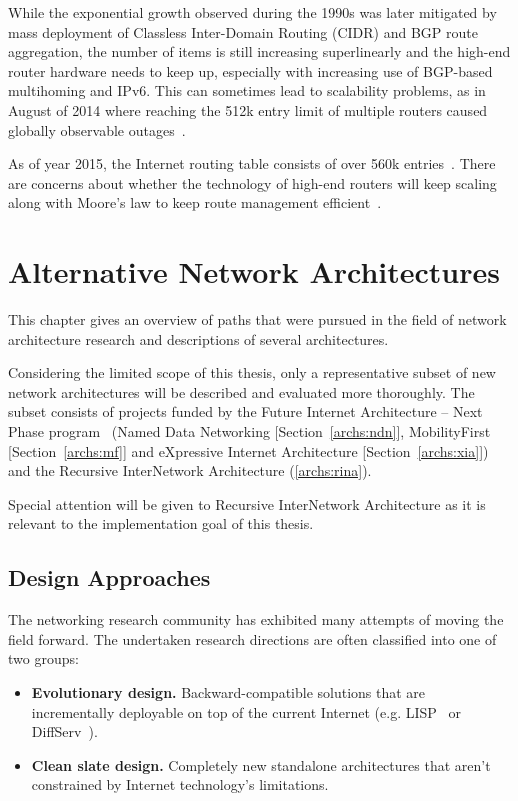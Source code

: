         While the exponential growth observed during the 1990s was later mitigated by mass deployment of Classless Inter-Domain Routing (CIDR) and BGP route aggregation, the number of items is still increasing superlinearly and the high-end router hardware needs to keep up, especially with increasing use of BGP-based multihoming and IPv6. This can sometimes lead to scalability problems, as in August of 2014 where reaching the 512k entry limit of multiple routers caused globally observable outages~\cite{512k_day}.

        As of year 2015, the Internet routing table consists of over 560k entries~\cite{bgpgrow}. There are concerns about whether the technology of high-end routers will keep scaling along with Moore's law to keep route management efficient~\cite{rfc4984}.


\chapter{Alternative Network Architectures}\label{archs}

    This chapter gives an overview of paths that were pursued in the field of network architecture research and descriptions of several architectures.

    Considering the limited scope of this thesis, only a representative subset of new network architectures will be described and evaluated more thoroughly. The subset consists of projects funded by the Future Internet Architecture -- Next Phase program~\cite{fia} (Named Data Networking [Section~\ref{archs:ndn}], MobilityFirst [Section~\ref{archs:mf}] and eXpressive Internet Architecture [Section~\ref{archs:xia}]) and the Recursive InterNetwork Architecture (\ref{archs:rina}).

    Special attention will be given to Recursive InterNetwork Architecture as it is relevant to the implementation goal of this thesis.

    \section{Design Approaches}

        The networking research community has exhibited many attempts of moving the field forward. The undertaken research directions are often classified into one of two groups:

        \begin{itemize}
            \item \textbf{Evolutionary design.} Backward-compatible solutions that are incrementally deployable on top of the current Internet (e.g. LISP~\cite{rfc6830} or DiffServ~\cite{rfc2474}).
            \item \textbf{Clean slate design.} Completely new standalone architectures that aren't constrained by Internet technology's limitations.
        \end{itemize}

